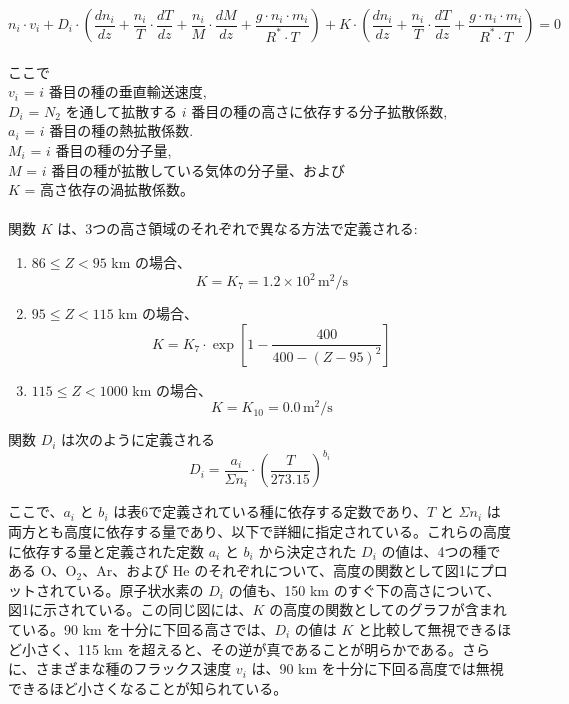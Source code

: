 \documentclass{article}
\begin{document}
\begin{equation}
  n_i \cdot v_i  + D_i \cdot \left ( \frac{dn_i}{dz} + \frac{n_i}{T} \cdot \frac{dT}{dz} + \frac{n_i}{M} \cdot \frac{dM}{dz}  + \frac{g \cdot n_i \cdot m_i}{R^* \cdot T}  \right ) + K \cdot \left ( \frac{dn_i}{dz} + \frac{n_i}{T} \cdot \frac{dT}{dz}  + \frac{g \cdot n_i \cdot m_i}{R^* \cdot T} \right ) = 0 \tag{6}
\end{equation}\\
ここで\\
$v_i$ = $i$ 番目の種の垂直輸送速度,\\
$D_i$ = $N_2$ を通して拡散する $i$ 番目の種の高さに依存する分子拡散係数,\\
$a_i$ = $i$ 番目の種の熱拡散係数.\\
$M_i$ = $i$ 番目の種の分子量,\\
$M$ = $i$ 番目の種が拡散している気体の分子量、および\\
$K$ = 高さ依存の渦拡散係数。\\
\\関数 $K$ は、3つの高さ領域のそれぞれで異なる方法で定義される:\\
\begin{enumerate}
    \item $86 \leq Z < 95$ km の場合、
    \[
    K = K_7 = 1.2 \times 10^2 \, \text{m}^2/\text{s} \tag{7a}
    \]

    \item $95 \leq Z < 115$ km の場合、
    \[
    K = K_7 \cdot \exp\left[1 - \frac{400}{400 - (Z - 95)^2}\right] \tag{7b}
    \]

    \item $115 \leq Z < 1000$ km の場合、
    \[
    K = K_{10} = 0.0 \, \text{m}^2/\text{s} \tag{7c}
    \]
\end{enumerate}

関数 $D_i$ は次のように定義される
\[
D_i = \frac{a_i}{\Sigma n_i} \cdot \left(\frac{T}{273.15}\right)^{b_i} \tag{8}
\]

ここで、$a_i$ と $b_i$ は表6で定義されている種に依存する定数であり、$T$ と $\Sigma n_i$ は両方とも高度に依存する量であり、以下で詳細に指定されている。これらの高度に依存する量と定義された定数 $a_i$ と $b_i$ から決定された $D_i$ の値は、4つの種である O、O$_2$、Ar、および He のそれぞれについて、高度の関数として図1にプロットされている。原子状水素の $D_i$ の値も、150 km のすぐ下の高さについて、図1に示されている。この同じ図には、$K$ の高度の関数としてのグラフが含まれている。90 km を十分に下回る高さでは、$D_i$ の値は $K$ と比較して無視できるほど小さく、115 km を超えると、その逆が真であることが明らかである。さらに、さまざまな種のフラックス速度 $v_i$ は、90 km を十分に下回る高度では無視できるほど小さくなることが知られている。
\end{document}
